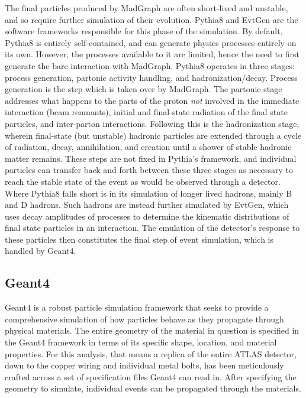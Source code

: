     The final particles produced by MadGraph are often short-lived and unstable,
        and so require further simulation of their evolution.
    Pythia8 and EvtGen are the software frameworks responsible for this phase of the simulation. 
    By default, Pythia8 is entirely self-contained, and can generate physics processes entirely on its own.
    However, the processes available to it are limited,
        hence the need to first generate the bare interaction with MadGraph.
    Pythia8 operates in three stages: process generation, partonic activity handling, and hadronization/decay.
    Process generation is the step which is taken over by MadGraph.
    The partonic stage addresses what happens to the parts of the proton \textit{not} involved in the immediate interaction (beam remnants),
        initial and final-state radiation of the final state particles, and inter-parton interactions.
    Following this is the hadronization stage, wherein final-state (but unstable)
        hadronic particles are extended through a cycle of radiation, decay, annihilation, and creation
        until a shower of stable hadronic matter remains.
    These steps are not fixed in Pythia's framework,
        and individual particles can transfer back and forth between these three stages
        as necessary to reach the stable state of the event as would be observed through a detector.
    Where Pythia8 falls short is in its simulation of longer lived hadrons,
        mainly B and D hadrons.
    Such hadrons are instead further simulated by EvtGen,
        which uses decay amplitudes of processes to determine the kinematic distributions
        of final state particles in an interaction.
    The emulation of the detector's response to these particles then constitutes the final step of event simulation,
        which is handled by Geant4.
    

    \subsection{Geant4}

    Geant4 is a robust particle simulation framework
        that seeks to provide a comprehensive simulation of how particles behave as they propagate through physical materials.
    The entire geometry of the material in question is specified in the Geant4 framework in terms of
        its specific shape, location, and material properties.
    For this analysis, that means a replica of the entire ATLAS detector,
        down to the copper wiring and individual metal bolts,
        has been meticulously crafted across a set of specification files Geant4 can read in.
    After specifying the geometry to simulate, individual events can be propagated through the materials.

